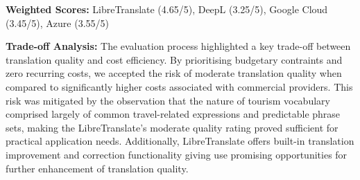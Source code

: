 \begin{table}[h!]
\centering
\caption{Translation Engine Evaluation Matrix}
\end{table}

\textbf{Weighted Scores:} LibreTranslate (4.65/5), DeepL (3.25/5), Google Cloud (3.45/5), Azure (3.55/5)

\textbf{Trade-off Analysis:}
The evaluation process highlighted a key trade-off between translation quality and cost efficiency. By prioritising budgetary contraints and zero recurring costs, we accepted the risk of moderate translation quality when compared to significantly higher costs associated with commercial providers. This risk was mitigated by the observation that the nature of tourism vocabulary comprised largely of common travel-related expressions and predictable phrase sets, making the LibreTranslate's moderate quality rating proved sufficient for practical application needs\cite{libretranslate}. Additionally, LibreTranslate offers built-in translation improvement and correction functionality giving use promising opportunities for further enhancement of translation quality\cite{open-nmt}.






